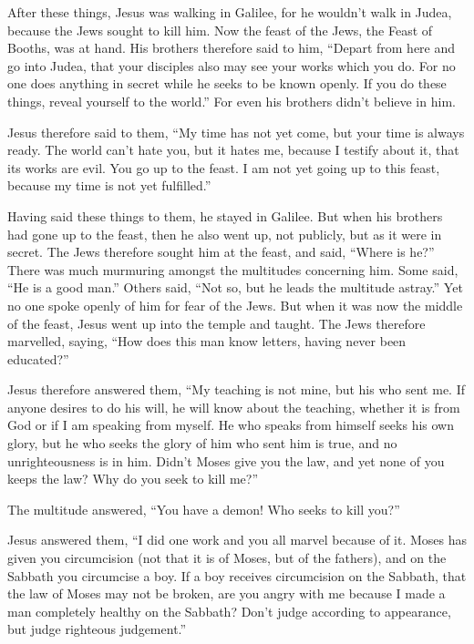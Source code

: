  After these things, Jesus was walking in Galilee, for he
wouldn't walk in Judea, because the Jews sought to kill him.
 Now the feast of the Jews, the Feast of Booths, was at
hand.  His brothers therefore said to him, ``Depart from
here and go into Judea, that your disciples also may see your works
which you do.  For no one does anything in secret while he
seeks to be known openly. If you do these things, reveal yourself to the
world.''  For even his brothers didn't believe in him.

 Jesus therefore said to them, ``My time has not yet come,
but your time is always ready.  The world can't hate you,
but it hates me, because I testify about it, that its works are evil.
 You go up to the feast. I am not yet going up to this
feast, because my time is not yet fulfilled.''

 Having said these things to them, he stayed in Galilee.
 But when his brothers had gone up to the feast, then he
also went up, not publicly, but as it were in secret.  The
Jews therefore sought him at the feast, and said, ``Where is he?''
 There was much murmuring amongst the multitudes concerning
him. Some said, ``He is a good man.'' Others said, ``Not so, but he
leads the multitude astray.''  Yet no one spoke openly of
him for fear of the Jews.  But when it was now the middle
of the feast, Jesus went up into the temple and taught. 
The Jews therefore marvelled, saying, ``How does this man know letters,
having never been educated?''

 Jesus therefore answered them, ``My teaching is not mine,
but his who sent me.  If anyone desires to do his will, he
will know about the teaching, whether it is from God or if I am speaking
from myself.  He who speaks from himself seeks his own
glory, but he who seeks the glory of him who sent him is true, and no
unrighteousness is in him.  Didn't Moses give you the law,
and yet none of you keeps the law? Why do you seek to kill me?''

 The multitude answered, ``You have a demon! Who seeks to
kill you?''

 Jesus answered them, ``I did one work and you all marvel
because of it.  Moses has given you circumcision (not that
it is of Moses, but of the fathers), and on the Sabbath you circumcise a
boy.  If a boy receives circumcision on the Sabbath, that
the law of Moses may not be broken, are you angry with me because I made
a man completely healthy on the Sabbath?  Don't judge
according to appearance, but judge righteous judgement.''

